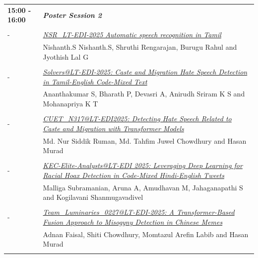 \documentclass[11pt,oneside]{book}
\begin{document}
\begin{tabular}{p{24mm}p{124mm}}
                      \textbf{15:00 - 16:00} & \emph{\textbf{Poster Session 2}}\\\\
      
                
                       -  & \hyperlink{page.95}{\emph{NSR\_LT-EDI-2025 Automatic speech recognition in Tamil}}\\
        & Nishanth.S Nishanth.S\index{Nishanth.S}, Shruthi Rengarajan\index{Rengarajan}, Burugu Rahul\index{Rahul} and Jyothish Lal G\index{G}\\\\
                
                       -  & \hyperlink{page.100}{\emph{Solvers@LT-EDI-2025: Caste and Migration Hate Speech Detection in Tamil-English Code-Mixed Text}}\\
        & Ananthakumar S\index{S}, Bharath P\index{P}, Devasri A\index{A}, Anirudh Sriram K S\index{S} and Mohanapriya K T\index{T}\\\\
                
                       -  & \hyperlink{page.105}{\emph{CUET\_N317@LT-EDI2025: Detecting Hate Speech Related to Caste and Migration with Transformer Models}}\\
        & Md. Nur Siddik Ruman\index{Ruman}, Md. Tahfim Juwel Chowdhury\index{Chowdhury} and Hasan Murad\index{Murad}\\\\
                
                       -  & \hyperlink{page.111}{\emph{KEC-Elite-Analysts@LT-EDI 2025: Leveraging Deep Learning for Racial Hoax Detection in Code-Mixed Hindi-English Tweets}}\\
        & Malliga Subramanian\index{Subramanian}, Aruna A\index{A}, Amudhavan M\index{M}, Jahaganapathi S\index{S} and Kogilavani Shanmugavadivel\index{Shanmugavadivel}\\\\
                
                       -  & \hyperlink{page.116}{\emph{Team\_Luminaries\_0227@LT-EDI-2025: A Transformer-Based Fusion Approach to Misogyny Detection in Chinese Memes}}\\
        & Adnan Faisal\index{Faisal}, Shiti Chowdhury\index{Chowdhury}, Momtazul Arefin Labib\index{Labib} and Hasan Murad\index{Murad}\\\\
              \end{tabular}
\end{document}

